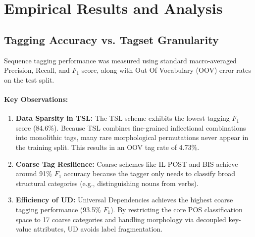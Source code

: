 \documentclass[11pt,a4paper]{article}
\begin{document}
\section{Empirical Results and Analysis}

\subsection{Tagging Accuracy vs. Tagset Granularity}

Sequence tagging performance was measured using standard macro-averaged Precision, Recall, and $F_1$ score, along with Out-Of-Vocabulary (OOV) error rates on the test split.

\begin{table}[htbp]
\centering
\caption{Comparative Sequence Tagging Performance on Test Set.}
\label{tab:tagging_results}
\end{table}

\paragraph{Key Observations:}
\begin{enumerate}[leftmargin=1.5em, itemsep=0.2em]
    \item \textbf{Data Sparsity in TSL:} The TSL scheme exhibits the lowest tagging $F_1$ score (84.6\%). Because TSL combines fine-grained inflectional combinations into monolithic tags, many rare morphological permutations never appear in the training split. This results in an OOV tag rate of 4.73\%.
    \item \textbf{Coarse Tag Resilience:} Coarse schemes like IL-POST and BIS achieve around 91\% $F_1$ accuracy because the tagger only needs to classify broad structural categories (e.g., distinguishing nouns from verbs).
    \item \textbf{Efficiency of UD:} Universal Dependencies achieves the highest coarse tagging performance (93.5\% $F_1$). By restricting the core POS classification space to 17 coarse categories and handling morphology via decoupled key-value attributes, UD avoids label fragmentation.
\end{enumerate}
\end{document}
